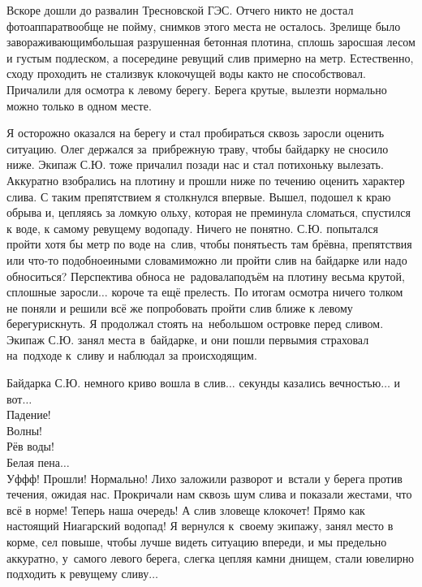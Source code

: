 Вскоре дошли до развалин Тресновской ГЭС. Отчего никто не достал фотоаппарат\mdash вообще не пойму, снимков этого места не осталось. Зрелище было завораживающим\mdash большая разрушенная бетонная плотина, сплошь заросшая лесом и густым подлеском, а посередине ревущий слив примерно на метр. Естественно, сходу проходить не стали\mdash звук клокочущей воды как\sdash то не способствовал. Причалили для осмотра к левому берегу. Берега крутые, вылезти нормально можно только в одном месте. 

Я осторожно оказался на берегу и стал пробираться сквозь заросли оценить ситуацию. Олег держался за~прибрежную траву, чтобы байдарку не сносило ниже. Экипаж С.Ю. тоже причалил позади нас и стал потихоньку вылезать. Аккуратно взобрались на плотину и прошли ниже по течению оценить характер слива. С таким препятствием я столкнулся впервые. Вышел, подошел к краю обрыва и, цепляясь за ломкую ольху, которая не преминула сломаться, спустился к воде, к самому ревущему водопаду. Ничего не понятно. С.Ю. попытался пройти хотя бы метр по воде на~слив, чтобы понять\mdash есть там брёвна, препятствия или что-то подобное\mdash иными словами\mdash можно ли пройти слив на байдарке или надо обноситься? Перспектива обноса не~радовала\mdash подъём на плотину весьма крутой, сплошные заросли$\ldots$ короче та ещё прелесть. По итогам осмотра ничего толком не поняли и решили всё же попробовать пройти слив ближе к левому берегу\mdash рискнуть. Я продолжал стоять на~небольшом островке перед сливом. Экипаж С.Ю. занял места в~байдарке, и они пошли первыми\mdash я страховал на~подходе к~сливу и наблюдал за происходящим.

Байдарка С.Ю. немного криво вошла в слив$\ldots$ секунды казались вечностью$\ldots$ и вот$\ldots$\\
Падение!\\
{\hspace*{19mm} \large Волны!\\
\hspace*{40mm} \Large Рёв воды!\\
\hspace*{70mm} \LARGE Белая пена$\ldots$}\\
\noindent Уф\sdash ф\sdash ф! Прошли! Нормально! Лихо заложили разворот и~встали у берега против течения, ожидая нас. Прокричали нам сквозь шум слива и показали жестами, что всё в норме! Теперь наша очередь! А слив зловеще клокочет! Прямо как настоящий Ниагарский водопад! Я вернулся к~своему экипажу, занял место в корме, сел повыше, чтобы лучше видеть ситуацию впереди, и мы предельно аккуратно, у~самого левого берега, слегка цепляя камни днищем, стали ювелирно подходить к ревущему сливу$\ldots$
 

